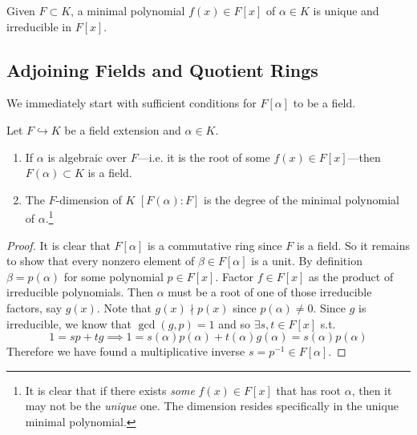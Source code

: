  \begin{theorem}
    Given $F \subset K$, a minimal polynomial $f(x) \in F[x]$ of $\alpha \in K$ is unique and irreducible in $F[x]$. 
  \end{theorem}

\subsection{Adjoining Fields and Quotient Rings} 

  We immediately start with sufficient conditions for $F[\alpha]$ to be a field. 
  
  \begin{theorem}
    Let $F \hookrightarrow K$ be a field extension and $\alpha \in K$. 
    \begin{enumerate}
      \item If $\alpha$ is algebraic over $F$---i.e. it is the root of some $f(x) \in F[x]$---then $F(\alpha) \subset K$ is a field. 
      \item The $F$-dimension of $K$ $[F(\alpha):F]$ is the degree of the minimal polynomial of $\alpha$.\footnote{It is clear that if there exists \textit{some} $f(x) \in F[x]$ that has root $\alpha$, then it may not be the \textit{unique} one. The dimension resides specifically in the unique minimal polynomial. } 
    \end{enumerate}
  \end{theorem}
  \begin{proof}
    It is clear that $F[\alpha]$ is a commutative ring since $F$ is a field. So it remains to show that every nonzero element of $\beta \in F[\alpha]$ is a unit. By definition $\beta = p(\alpha)$ for some polynomial $p \in F[x]$.  Factor $f \in F[x]$ as the product of irreducible polynomials. Then $\alpha$ must be a root of one of those irreducible factors, say $g(x)$. Note that $g(x) \nmid p(x)$ since $p(\alpha) \neq 0$. Since $g$ is irreducible, we know that $\gcd(g, p) = 1$ and so $\exists s, t \in F[x]$ s.t. 
    \begin{equation}
      1 = s p + t g \implies 1 = s(\alpha) p(\alpha) + t(\alpha) g(\alpha) = s(\alpha) p(\alpha)
    \end{equation}  
    Therefore we have found a multiplicative inverse $s = p^{-1} \in F[\alpha]$. 
  \end{proof} 
